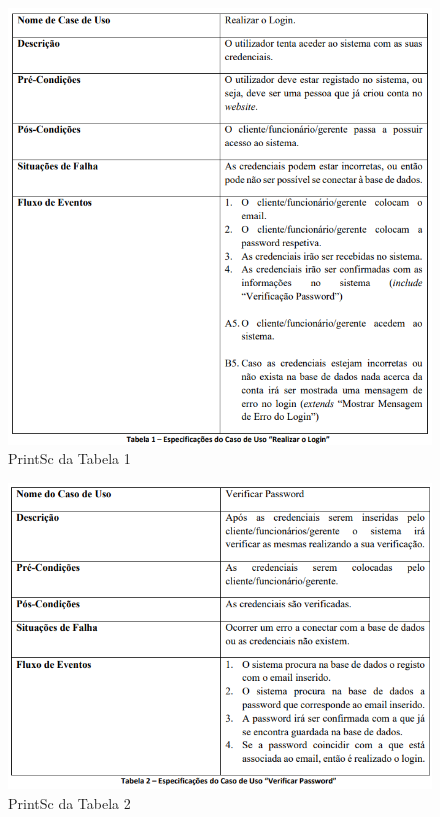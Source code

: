 \begin{figure}[!hbt]
    \centering
    \includegraphics[width=14cm]{Resources/TablesPrintSc/1.png}
    \caption{PrintSc da Tabela 1}
    
\end{figure}
\FloatBarrier
\begin{figure}[!hbt]
    \centering
    \includegraphics[width=14cm]{Resources/TablesPrintSc/2.png}
    \caption{PrintSc da Tabela 2}
    
\end{figure}
